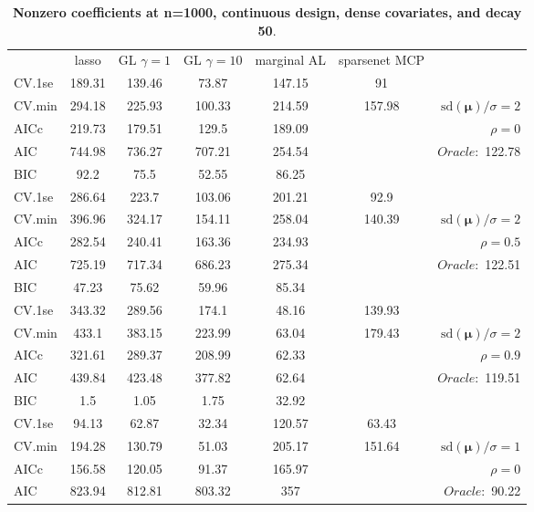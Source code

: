 \clearpage
\begin{table}\vspace{-.5cm}
\caption[l]{ { \bf Nonzero coefficients at n=1000, continuous design, 
dense covariates, and  decay  50}.}
\vspace{-.5cm}
\footnotesize{}
\begin{center}
\begin{tabular}{l*{5}{c}|r}
& lasso & GL $\gamma=1$ & GL $\gamma=10$ & marginal AL & sparsenet MCP  & \\
 \cline{1-7}
CV.1se & 189.31 & 139.46 & 73.87 & 147.15 & 91 & \\
CV.min & 294.18 & 225.93 & 100.33 & 214.59 & 157.98 &  $\mathrm{sd}(\mathbf{\mu})/\sigma=2$ \\
AICc & 219.73 & 179.51 & 129.5 & 189.09 & & $\rho=0$ \\
AIC & 744.98 & 736.27 & 707.21 & 254.54 & &  \multirow{2}{*}{$Oracle: $ 122.78} \\
BIC & 92.2 & 75.5 & 52.55 & 86.25 & &  \\
 \hline 
CV.1se & 286.64 & 223.7 & 103.06 & 201.21 & 92.9 & \\
CV.min & 396.96 & 324.17 & 154.11 & 258.04 & 140.39 &  $\mathrm{sd}(\mathbf{\mu})/\sigma=2$ \\
AICc & 282.54 & 240.41 & 163.36 & 234.93 & & $\rho=0.5$ \\
AIC & 725.19 & 717.34 & 686.23 & 275.34 & &  \multirow{2}{*}{$Oracle: $ 122.51} \\
BIC & 47.23 & 75.62 & 59.96 & 85.34 & &  \\
 \hline 
CV.1se & 343.32 & 289.56 & 174.1 & 48.16 & 139.93 & \\
CV.min & 433.1 & 383.15 & 223.99 & 63.04 & 179.43 &  $\mathrm{sd}(\mathbf{\mu})/\sigma=2$ \\
AICc & 321.61 & 289.37 & 208.99 & 62.33 & & $\rho=0.9$ \\
AIC & 439.84 & 423.48 & 377.82 & 62.64 & &  \multirow{2}{*}{$Oracle: $ 119.51} \\
BIC & 1.5 & 1.05 & 1.75 & 32.92 & &  \\
 \hline 
CV.1se & 94.13 & 62.87 & 32.34 & 120.57 & 63.43 & \\
CV.min & 194.28 & 130.79 & 51.03 & 205.17 & 151.64 &  $\mathrm{sd}(\mathbf{\mu})/\sigma=1$ \\
AICc & 156.58 & 120.05 & 91.37 & 165.97 & & $\rho=0$ \\
AIC & 823.94 & 812.81 & 803.32 & 357 & &  \multirow{2}{*}{$Oracle: $ 90.22} \\

\end{tabular}
\end{center}
\end{table}
